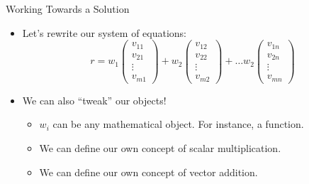 \documentclass[handout]{beamer}
\begin{document}
\begin{frame}{Working Towards a Solution}
    \begin{itemize}
        \item Let's rewrite our system of equations:
        \[
        r = 
        w_1 
        \left( 
        \begin{array}{c}
        v_{11} \\
        v_{21} \\
        \vdots \\
        v_{m1} 
        \end{array}
        \right)
        +
        w_2 
        \left( 
        \begin{array}{c}
        v_{12} \\
        v_{22} \\
        \vdots \\
        v_{m2} 
        \end{array}
        \right)
        + \ldots
        w_2 
        \left( 
        \begin{array}{c}
        v_{1n} \\
        v_{2n} \\
        \vdots \\
        v_{mn} 
        \end{array}
        \right)
        \]
        \item We can also ``tweak'' our objects!
        \begin{itemize}
            \item $w_i$ can be any mathematical object. For instance, a function.
            \item We can define our own concept of scalar multiplication\footnotemark[1].
            \item We can define our own concept of vector addition\footnotemark[1].
        \end{itemize}
    \end{itemize}
\end{frame}
\end{document}
